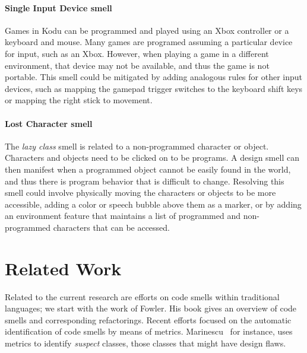 \documentclass[conference]{IEEEtran}
\begin{document}
% 



\paragraph{Single Input Device smell}
Games in Kodu can be programmed and played using an Xbox controller or a keyboard and mouse. Many games are programed assuming a particular device for input, such as an Xbox. However, when playing a game in a different environment, that device may not be available, and thus the game is not portable. This smell could be mitigated by adding analogous rules for other input devices, such as mapping the gamepad trigger switches to the keyboard shift keys or mapping the right stick to movement. 

\paragraph{Lost Character smell}
The \emph{lazy class} smell is related to a non-programmed character or object. Characters and objects need to be clicked on to be programs. A design smell can then manifest when a programmed object cannot be easily found in the world, and thus there is program behavior that is difficult to change. Resolving this smell could involve physically moving the characters or objects to be more accessible, adding a color or speech bubble above them as a marker, or by adding an environment feature that maintains a list of programmed and non-programmed characters that can be accessed. 	

\section{Related Work}

\label{sec:related_work}
Related to the current research are efforts on code smells within traditional languages; we start with the work of Fowler\cite{Fowl1999}. His book gives an overview of code smells and corresponding refactorings. Recent efforts focused on the automatic identification of code smells by means of metrics. Marinescu~\cite{Mari2001} for instance, uses metrics to identify \emph{suspect} classes, those classes that might have design flaws. 
\end{document}
